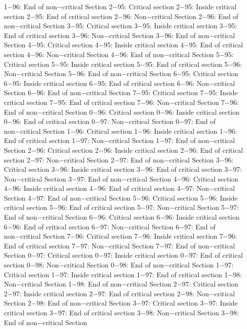 1−96: End of non−critical Section
2−95: Critical section
2−95: Inside critical section
2−95: End of critical section
2−96: Non−critical Section
2−96: End of non−critical Section
3−95: Critical section
3−95: Inside critical section
3−95: End of critical section
3−96: Non−critical Section
3−96: End of non−critical Section
4−95: Critical section
4−95: Inside critical section
4−95: End of critical section
4−96: Non−critical Section
4−96: End of non−critical Section
5−95: Critical section
5−95: Inside critical section
5−95: End of critical section
5−96: Non−critical Section
5−96: End of non−critical Section
6−95: Critical section
6−95: Inside critical section
6−95: End of critical section
6−96: Non−critical Section
6−96: End of non−critical Section
7−95: Critical section
7−95: Inside critical section
7−95: End of critical section
7−96: Non−critical Section
7−96: End of non−critical Section
0−96: Critical section
0−96: Inside critical section
0−96: End of critical section
0−97: Non−critical Section
0−97: End of non−critical Section
1−96: Critical section
1−96: Inside critical section
1−96: End of critical section
1−97: Non−critical Section
1−97: End of non−critical Section
2−96: Critical section
2−96: Inside critical section
2−96: End of critical section
2−97: Non−critical Section
2−97: End of non−critical Section
3−96: Critical section
3−96: Inside critical section
3−96: End of critical section
3−97: Non−critical Section
3−97: End of non−critical Section
4−96: Critical section
4−96: Inside critical section
4−96: End of critical section
4−97: Non−critical Section
4−97: End of non−critical Section
5−96: Critical section
5−96: Inside critical section
5−96: End of critical section
5−97: Non−critical Section
5−97: End of non−critical Section
6−96: Critical section
6−96: Inside critical section
6−96: End of critical section
6−97: Non−critical Section
6−97: End of non−critical Section
7−96: Critical section
7−96: Inside critical section
7−96: End of critical section
7−97: Non−critical Section
7−97: End of non−critical Section
0−97: Critical section
0−97: Inside critical section
0−97: End of critical section
0−98: Non−critical Section
0−98: End of non−critical Section
1−97: Critical section
1−97: Inside critical section
1−97: End of critical section
1−98: Non−critical Section
1−98: End of non−critical Section
2−97: Critical section
2−97: Inside critical section
2−97: End of critical section
2−98: Non−critical Section
2−98: End of non−critical Section
3−97: Critical section
3−97: Inside critical section
3−97: End of critical section
3−98: Non−critical Section
3−98: End of non−critical Section
